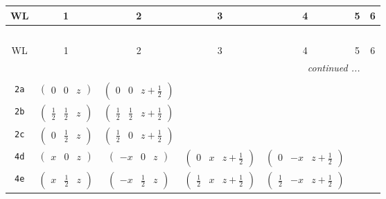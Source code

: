 \documentclass[fleqn,9pt,landscape]{jsarticle}
\begin{document}
\begin{center}
\renewcommand{\arraystretch}{1.2}
\begin{longtable}{ccccccc}
 \hline \hline
WL & 1 & 2 & 3 & 4 & 5 & 6 \\ \hline \endfirsthead

\multicolumn{6}{l}{\tablename\ \thetable{}} \\
 \hline \hline
WL & 1 & 2 & 3 & 4 & 5 & 6 \\ \hline \endhead

 \hline \hline
\multicolumn{6}{r}{\footnotesize\it continued ...} \\ \endfoot

 \hline \hline
\multicolumn{6}{r}{} \\ \endlastfoot

{\tt 2a} & $ \begin{pmatrix} 0 & 0 & z \end{pmatrix} $ & $ \begin{pmatrix} 0 & 0 & z + \frac{1}{2} \end{pmatrix} $ & $  $ & $  $ & $  $ & $  $ \\ \hline
{\tt 2b} & $ \begin{pmatrix} \frac{1}{2} & \frac{1}{2} & z \end{pmatrix} $ & $ \begin{pmatrix} \frac{1}{2} & \frac{1}{2} & z + \frac{1}{2} \end{pmatrix} $ & $  $ & $  $ & $  $ & $  $ \\ \hline
{\tt 2c} & $ \begin{pmatrix} 0 & \frac{1}{2} & z \end{pmatrix} $ & $ \begin{pmatrix} \frac{1}{2} & 0 & z + \frac{1}{2} \end{pmatrix} $ & $  $ & $  $ & $  $ & $  $ \\ \hline
{\tt 4d} & $ \begin{pmatrix} x & 0 & z \end{pmatrix} $ & $ \begin{pmatrix} - x & 0 & z \end{pmatrix} $ & $ \begin{pmatrix} 0 & x & z + \frac{1}{2} \end{pmatrix} $ & $ \begin{pmatrix} 0 & - x & z + \frac{1}{2} \end{pmatrix} $ & $  $ & $  $ \\ \hline
{\tt 4e} & $ \begin{pmatrix} x & \frac{1}{2} & z \end{pmatrix} $ & $ \begin{pmatrix} - x & \frac{1}{2} & z \end{pmatrix} $ & $ \begin{pmatrix} \frac{1}{2} & x & z + \frac{1}{2} \end{pmatrix} $ & $ \begin{pmatrix} \frac{1}{2} & - x & z + \frac{1}{2} \end{pmatrix} $ & $  $ & $  $ \\ \hline

\end{longtable}
\end{center}
\end{document}

